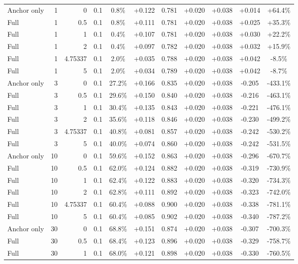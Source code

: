 \begin{table}[htbp]
\begin{tabular}{lrrrccccccc}
Anchor only & 1 & 0 & 0.1 & 0.8\% & +0.122 & 0.781 & +0.020 & +0.038 & +0.014 & +64.4\% \\
Full & 1 & 0.5 & 0.1 & 0.8\% & +0.111 & 0.781 & +0.020 & +0.038 & +0.025 & +35.3\% \\
Full & 1 & 1 & 0.1 & 0.4\% & +0.107 & 0.781 & +0.020 & +0.038 & +0.030 & +22.2\% \\
Full & 1 & 2 & 0.1 & 0.4\% & +0.097 & 0.782 & +0.020 & +0.038 & +0.032 & +15.9\% \\
Full & 1 & 4.75337 & 0.1 & 2.0\% & +0.035 & 0.788 & +0.020 & +0.038 & +0.042 & -8.5\% \\
Full & 1 & 5 & 0.1 & 2.0\% & +0.034 & 0.789 & +0.020 & +0.038 & +0.042 & -8.7\% \\
Anchor only & 3 & 0 & 0.1 & 27.2\% & +0.166 & 0.835 & +0.020 & +0.038 & -0.205 & -433.1\% \\
Full & 3 & 0.5 & 0.1 & 29.6\% & +0.150 & 0.840 & +0.020 & +0.038 & -0.216 & -463.1\% \\
Full & 3 & 1 & 0.1 & 30.4\% & +0.135 & 0.843 & +0.020 & +0.038 & -0.221 & -476.1\% \\
Full & 3 & 2 & 0.1 & 35.6\% & +0.118 & 0.846 & +0.020 & +0.038 & -0.230 & -499.2\% \\
Full & 3 & 4.75337 & 0.1 & 40.8\% & +0.081 & 0.857 & +0.020 & +0.038 & -0.242 & -530.2\% \\
Full & 3 & 5 & 0.1 & 40.0\% & +0.074 & 0.860 & +0.020 & +0.038 & -0.242 & -531.5\% \\
Anchor only & 10 & 0 & 0.1 & 59.6\% & +0.152 & 0.863 & +0.020 & +0.038 & -0.296 & -670.7\% \\
Full & 10 & 0.5 & 0.1 & 62.0\% & +0.124 & 0.882 & +0.020 & +0.038 & -0.319 & -730.9\% \\
Full & 10 & 1 & 0.1 & 62.4\% & +0.122 & 0.883 & +0.020 & +0.038 & -0.320 & -734.3\% \\
Full & 10 & 2 & 0.1 & 62.8\% & +0.111 & 0.892 & +0.020 & +0.038 & -0.323 & -742.0\% \\
Full & 10 & 4.75337 & 0.1 & 60.4\% & +0.088 & 0.900 & +0.020 & +0.038 & -0.338 & -781.1\% \\
Full & 10 & 5 & 0.1 & 60.4\% & +0.085 & 0.902 & +0.020 & +0.038 & -0.340 & -787.2\% \\
Anchor only & 30 & 0 & 0.1 & 68.8\% & +0.151 & 0.874 & +0.020 & +0.038 & -0.307 & -700.3\% \\
Full & 30 & 0.5 & 0.1 & 68.4\% & +0.123 & 0.896 & +0.020 & +0.038 & -0.329 & -758.7\% \\
Full & 30 & 1 & 0.1 & 68.0\% & +0.121 & 0.898 & +0.020 & +0.038 & -0.330 & -760.5\% \\

\end{tabular}
\end{table}
